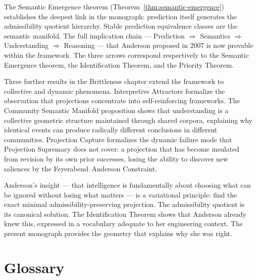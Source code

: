 \documentclass[12pt, a4paper, oneside]{book}
\begin{document}
The Semantic Emergence theorem (Theorem~\ref{thm:semantic-emergence})
establishes the deepest link in the monograph: prediction itself
generates the admissibility quotient hierarchy. Stable prediction
equivalence classes are the semantic manifold. The full implication
chain --- Prediction $\Rightarrow$ Semantics $\Rightarrow$
Understanding $\Rightarrow$ Reasoning --- that Anderson proposed in
2007 is now provable within the framework. The three arrows correspond
respectively to the Semantic Emergence theorem, the Identification
Theorem, and the Priority Theorem.

Three further results in the Brittleness chapter extend the framework
to collective and dynamic phenomena. Interpretive Attractors formalize
the observation that projections concentrate into self-reinforcing
frameworks. The Community Semantic Manifold proposition shows that
understanding is a collective geometric structure maintained through
shared corpora, explaining why identical events can produce radically
different conclusions in different communities. Projection Capture
formalizes the dynamic failure mode that Projection Supremacy does not
cover: a projection that has become insulated from revision by its own
prior successes, losing the ability to discover new saliences by the
Feyerabend--Anderson Constraint.

Anderson's insight --- that intelligence is fundamentally about choosing
what can be ignored without losing what matters --- is a variational
principle: find the exact minimal admissibility-preserving projection.
The admissibility quotient is its canonical solution. The Identification
Theorem shows that Anderson already knew this, expressed in a vocabulary
adequate to her engineering context. The present monograph provides the
geometry that explains why she was right.

\clearpage

\appendix

\chapter{Glossary}
\label{app:glossary}
\end{document}
